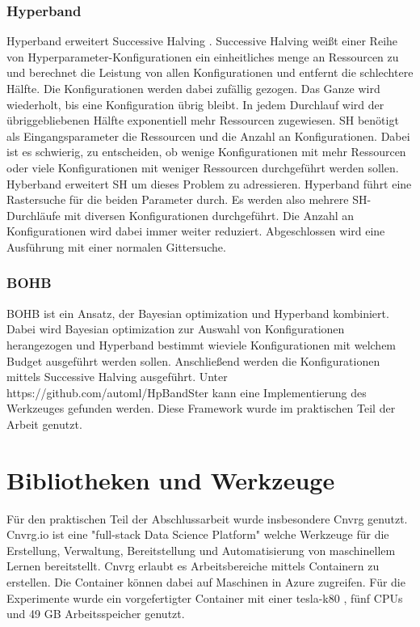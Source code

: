 	\subsubsection{Hyperband}	
	Hyperband \cite{Li.2017} erweitert Successive Halving \cite{Jamieson.27.02.2015}. Successive Halving weißt einer Reihe von Hyperparameter-Konfigurationen ein einheitliches menge an Ressourcen zu und berechnet die Leistung von allen Konfigurationen und entfernt die schlechtere Hälfte. Die Konfigurationen werden dabei zufällig gezogen. Das Ganze wird wiederholt, bis eine Konfiguration übrig bleibt. In jedem Durchlauf wird der übriggebliebenen Hälfte exponentiell mehr Ressourcen zugewiesen. SH benötigt als Eingangsparameter die Ressourcen und die Anzahl an Konfigurationen. Dabei ist es schwierig, zu entscheiden, ob wenige Konfigurationen mit mehr Ressourcen oder viele Konfigurationen mit weniger Ressourcen durchgeführt werden sollen.
	Hyberband erweitert SH um dieses Problem zu adressieren. Hyperband führt eine Rastersuche für die beiden Parameter durch. Es werden also mehrere SH-Durchläufe mit diversen Konfigurationen durchgeführt. Die Anzahl an Konfigurationen wird dabei immer weiter reduziert. Abgeschlossen wird eine Ausführung mit einer normalen Gittersuche.
	
	\subsubsection{BOHB}
	BOHB \cite{StefanFalkner.2018} ist ein Ansatz, der Bayesian optimization und Hyperband kombiniert. Dabei wird Bayesian optimization zur Auswahl von Konfigurationen herangezogen und Hyperband bestimmt wieviele Konfigurationen mit welchem Budget ausgeführt werden sollen. Anschließend werden die Konfigurationen mittels Successive Halving ausgeführt. Unter https://github.com/automl/HpBandSter kann eine Implementierung des Werkzeuges gefunden werden. Diese Framework wurde im praktischen Teil der Arbeit genutzt.
			
	\section{Bibliotheken und Werkzeuge}
	\label{sec:BibliothekenundWerkzeuge}
	Für den praktischen Teil der Abschlussarbeit wurde insbesondere Cnvrg \cite{cnvrg.io.} genutzt. Cnvrg.io ist eine "full-stack Data Science Platform" welche Werkzeuge für die Erstellung, Verwaltung, Bereitstellung und Automatisierung von maschinellem Lernen bereitstellt. Cnvrg erlaubt es Arbeitsbereiche mittels Containern zu erstellen. Die Container können dabei auf Maschinen in Azure \cite{Micorsoft.2020} zugreifen. Für die Experimente wurde ein vorgefertigter Container mit einer tesla-k80 \cite{Nvidia.2020}, fünf CPUs und 49 GB Arbeitsspeicher genutzt. 

